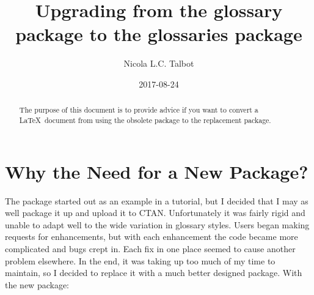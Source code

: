 \documentclass{nlctdoc}
\title{Upgrading from the glossary package to the glossaries
package}
\author{Nicola L.C. Talbot}
\date{2017-08-24}
\begin{document}
\maketitle

\begin{abstract}
The purpose of this document is to provide advice if you want to
convert a \LaTeX\ document from using the obsolete 
package to the replacement  package.
\end{abstract}

\tableofcontents

\section{Why the Need for a New Package?}
\label{whyglossaries}

The  package started out as an example in a tutorial,
but I decided that I may as well package it up and upload it to CTAN.
Unfortunately it was fairly rigid and unable to adapt well to the
wide variation in glossary styles. Users began making requests for
enhancements, but with each enhancement the code became more
complicated and bugs crept in. Each fix in one place seemed to cause
another problem elsewhere. In the end, it was taking up too much
of my time to maintain, so I decided to replace it with a much
better designed package. With the new  package:
\end{document}

